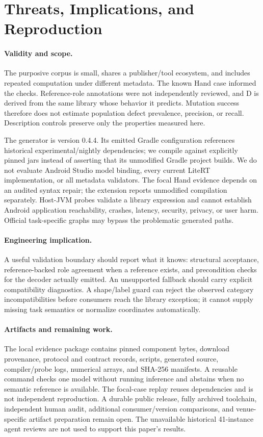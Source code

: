 \documentclass[10pt,twocolumn,letterpaper]{article}
\begin{document}
\section{Threats, Implications, and Reproduction}
\paragraph{Validity and scope.}
The purposive corpus is small, shares a publisher/tool ecosystem, and includes repeated computation under different metadata. The known Hand case informed the checks. Reference-role annotations were not independently reviewed, and D is derived from the same library whose behavior it predicts. Mutation success therefore does not estimate population defect prevalence, precision, or recall. Description controls preserve only the properties measured here.

The generator is version 0.4.4. Its emitted Gradle configuration references historical experimental/nightly dependencies; we compile against explicitly pinned jars instead of asserting that its unmodified Gradle project builds. We do not evaluate Android Studio model binding, every current LiteRT implementation, or all metadata validators. The focal Hand evidence depends on an audited syntax repair; the extension reports unmodified compilation separately. Host-JVM probes validate a library expression and cannot establish Android application reachability, crashes, latency, security, privacy, or user harm. Official task-specific graphs may bypass the problematic generated paths.

\paragraph{Engineering implication.}
A useful validation boundary should report what it knows: structural acceptance, reference-backed role agreement when a reference exists, and precondition checks for the decoder actually emitted. An unsupported fallback should carry explicit compatibility diagnostics. A shape/label guard can reject the observed category incompatibilities before consumers reach the library exception; it cannot supply missing task semantics or normalize coordinates automatically.

\balance
\paragraph{Artifacts and remaining work.}
The local evidence package contains pinned component bytes, download provenance, protocol and contract records, scripts, generated source, compiler/probe logs, numerical arrays, and SHA-256 manifests. A reusable command checks one model without running inference and abstains when no semantic reference is available. The focal-case replay reuses dependencies and is not independent reproduction. A durable public release, fully archived toolchain, independent human audit, additional consumer/version comparisons, and venue-specific artifact preparation remain open. The unavailable historical 41-instance agent reviews are not used to support this paper's results.
\end{document}
